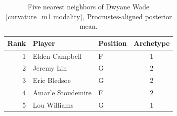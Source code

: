 \begin{table}[htbp]
  \centering\small
  \begin{tabular}{rllc}
    \toprule
    Rank & Player & Position & Archetype \\
    \midrule
    1 & Elden Campbell & F & 1 \\
    2 & Jeremy Lin & G & 2 \\
    3 & Eric Bledsoe & G & 2 \\
    4 & Amar'e Stoudemire & F & 2 \\
    5 & Lou Williams & G & 1 \\
    \bottomrule
  \end{tabular}
  \caption{Five nearest neighbors of Dwyane Wade (curvature_m1 modality), Procrustes-aligned posterior mean.}
  \label{tab:Dwyane_Wade_neighbors_curvature_m1}
\end{table}

